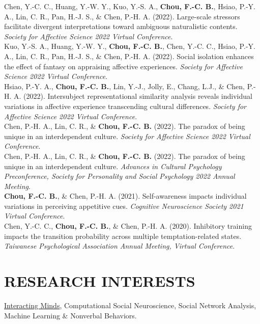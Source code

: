 \documentclass[a4paper,12pt]{article}
\newcommand{\sectionspace}{0pt} %
\newcommand{\itemspace}{7pt} %
\begin{document}
\noindent Chen, Y.-C. C., Huang, Y.-W. Y., Kuo, Y.-S. A., \textbf{Chou, F.-C. B.}, Hsiao, P.-Y. A., Lin, C. R., Pan, H.-J. S., \& Chen, P.-H. A. (2022). Large-scale stressors facilitate divergent interpretations toward ambiguous naturalistic contents. \textit{Society for Affective Science 2022 Virtual Conference}.\\[\itemspace]
\noindent Kuo, Y.-S. A., Huang, Y.-W. Y., \textbf{Chou, F.-C. B.}, Chen, Y.-C. C., Hsiao, P.-Y. A., Lin, C. R., Pan, H.-J. S., \& Chen, P.-H. A. (2022). Social isolation enhances the effect of fantasy on appraising affective experiences. \textit{Society for Affective Science 2022 Virtual Conference}.\\[\itemspace]
\noindent Hsiao, P.-Y. A., \textbf{Chou, F.-C. B.}, Lin, Y.-J., Jolly, E., Chang, L.J., \& Chen, P.-H. A. (2022). Intersubject representational similarity analysis reveals individual variations in affective experience transcending cultural differences. \textit{Society for Affective Science 2022 Virtual Conference}.\\[\itemspace]
\noindent Chen, P.-H. A., Lin, C. R., \& \textbf{Chou, F.-C. B.} (2022). The paradox of being unique in an interdependent culture. \textit{Society for Affective Science 2022 Virtual Conference}.\\[\itemspace]
\noindent Chen, P.-H. A., Lin, C. R., \& \textbf{Chou, F.-C. B.} (2022). The paradox of being unique in an interdependent culture. \textit{Advances in Cultural Psychology Preconference, Society for Personality and Social Psychology 2022 Annual Meeting}.\\[\itemspace]
\noindent \textbf{Chou, F.-C. B.}, \& Chen, P.-H. A. (2021). Self-awareness impacts individual variations in perceiving appetitive cues. \textit{Cognitive Neuroscience Society 2021 Virtual Conference}.\\[\itemspace]
\noindent Chen, Y.-C. C., \textbf{Chou, F.-C. B.}, \& Chen, P.-H. A. (2020). Inhibitory training impacts the transition probability across multiple temptation-related states. \textit{Taiwanese Psychological Association Annual Meeting, Virtual Conference}.

\vspace{\sectionspace}

\section*{RESEARCH INTERESTS}
\href{https://www.interactingminds.com}{Interacting Minds}, Computational Social Neuroscience, Social Network Analysis, Machine Learning \& Nonverbal Behaviors. \\[\sectionspace]
\end{document}

